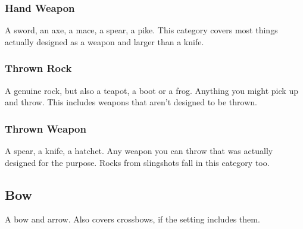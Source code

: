 \subsubsection{Hand Weapon}
A sword, an axe, a mace, a spear, a pike.
This category covers most things actually designed as a weapon and larger than a knife.

\subsubsection{Thrown Rock}
A genuine rock, but also a teapot, a boot or a frog.
Anything you might pick up and throw.
This includes weapons that aren't designed to be thrown.

\subsubsection{Thrown Weapon}
A spear, a knife, a hatchet.
Any weapon you can throw that was actually designed for the purpose.
Rocks from slingshots fall in this category too.

\subsection{Bow}
A bow and arrow.
Also covers crossbows, if the setting includes them.

